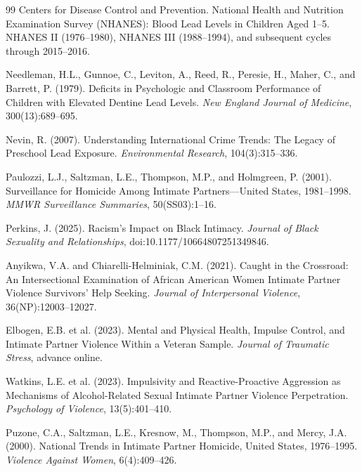 \documentclass[12pt, letterpaper]{article}
\begin{document}
\begin{thebibliography}{99}
Centers for Disease Control and Prevention.
\newblock National Health and Nutrition Examination Survey (NHANES): Blood Lead Levels in Children Aged 1--5.
\newblock NHANES II (1976--1980), NHANES III (1988--1994), and subsequent cycles through 2015--2016.

Needleman, H.L., Gunnoe, C., Leviton, A., Reed, R., Peresie, H., Maher, C., and Barrett, P. (1979).
\newblock Deficits in Psychologic and Classroom Performance of Children with Elevated Dentine Lead Levels.
\newblock \textit{New England Journal of Medicine}, 300(13):689--695.

Nevin, R. (2007).
\newblock Understanding International Crime Trends: The Legacy of Preschool Lead Exposure.
\newblock \textit{Environmental Research}, 104(3):315--336.

Paulozzi, L.J., Saltzman, L.E., Thompson, M.P., and Holmgreen, P. (2001).
\newblock Surveillance for Homicide Among Intimate Partners---United States, 1981--1998.
\newblock \textit{MMWR Surveillance Summaries}, 50(SS03):1--16.

Perkins, J. (2025).
\newblock Racism's Impact on Black Intimacy.
\newblock \textit{Journal of Black Sexuality and Relationships}, doi:10.1177/10664807251349846.

Anyikwa, V.A. and Chiarelli-Helminiak, C.M. (2021).
\newblock Caught in the Crossroad: An Intersectional Examination of African American Women Intimate Partner Violence Survivors' Help Seeking.
\newblock \textit{Journal of Interpersonal Violence}, 36(NP):12003--12027.

Elbogen, E.B. et al. (2023).
\newblock Mental and Physical Health, Impulse Control, and Intimate Partner Violence Within a Veteran Sample.
\newblock \textit{Journal of Traumatic Stress}, advance online.

Watkins, L.E. et al. (2023).
\newblock Impulsivity and Reactive-Proactive Aggression as Mechanisms of Alcohol-Related Sexual Intimate Partner Violence Perpetration.
\newblock \textit{Psychology of Violence}, 13(5):401--410.

Puzone, C.A., Saltzman, L.E., Kresnow, M., Thompson, M.P., and Mercy, J.A. (2000).
\newblock National Trends in Intimate Partner Homicide, United States, 1976--1995.
\newblock \textit{Violence Against Women}, 6(4):409--426.


\end{thebibliography}
\end{document}
